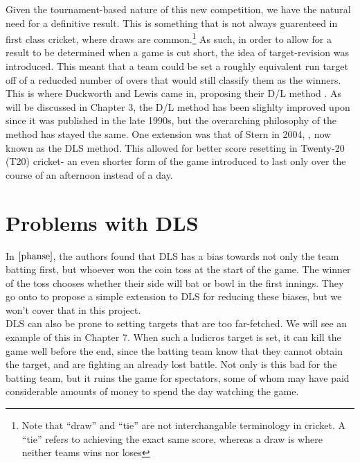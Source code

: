Given the tournament-based nature of this new competition, we have the natural need for a definitive result.
This is something that is not always guarenteed in first class cricket, where draws are common.\footnote{Note that 
``draw'' and ``tie'' are not interchangable terminology in cricket. A ``tie'' refers to achieving the exact same score, whereas a draw is where neither teams wins nor loses} As such, in order to allow for a result to be
determined when a game is cut short, the idea of target-revision was introduced. This meant that a team could be set a
roughly equivalent run target off of a reducded number of overs that would still classify them as the winners.
This is where Duckworth and Lewis came in, proposing their D/L method \cite{duckworth}. As will be discussed in Chapter 3, the D/L method 
has been slighlty improved upon since it was published in the late 1990s, but the overarching philosophy of the method has stayed the same. 
One extension was that of Stern in 2004, \cite{stern}, now  known as the DLS method. This allowed for better score resetting in Twenty-20 (T20) cricket- an even shorter 
form of the game introduced to last only over the course of an afternoon instead of a day. 


\section{Problems with DLS}
In $\cite{phanse}$, the authors found that DLS has a bias towards not only the team batting first, but whoever won the coin toss at the start of the game.
The winner of the toss chooses whether their side will bat or bowl in the first innings. They go onto to propose a simple extension to DLS for reducing
these biases, but we won't cover that in this project. \\

DLS can also be prone to setting targets that are too far-fetched. We will see an example of this in Chapter 7. When such a ludicros target is set, it 
can kill the game well before the end, since the batting team know that they cannot obtain the target, and are fighting an already lost battle. Not only 
is this bad for the batting team, but it ruins the game for spectators, some of whom may have paid considerable amounts of money to spend the day watching the game. \\

